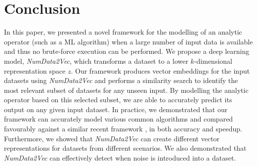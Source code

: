 \section{Conclusion}
In this paper, we presented a novel framework for the modelling of an analytic operator (such as a ML algorithm) when a large number of input data is available and thus no brute-force execution can be performed. We propose a deep learning model, \textit{NumData2Vec}, which transforms a dataset to a lower $k$-dimensional representation space $z$. Our framework produces vector embeddings for the input datasets using \textit{NumData2Vec} and performs a similarity search to identify the most relevant subset of datasets for any unseen input. By modelling the analytic operator based on this selected subset, we are able to accurately predict its output on any given input dataset. In practice, we demonstrated that our framework can accurately model various common algorithms and compared favourably against a similar recent framework \cite{b7Apollo1}, in both accuracy and speedup. Furthermore, we showed that \textit{NumData2Vec} can create different vector representations for datasets from different scenarios. We also demonstrated that \textit{NumData2Vec} can effectively detect when noise is introduced into a dataset.



